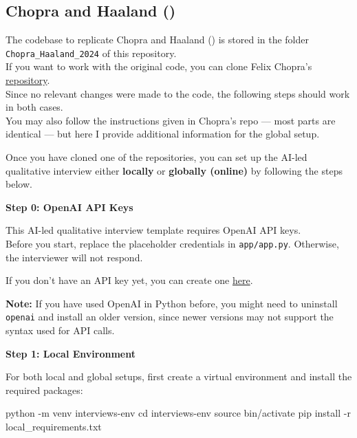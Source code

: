 \documentclass[
  letterpaper,
  DIV=11,
  numbers=noendperiod]{scrartcl}
\newenvironment{Shaded}{\begin{snugshade}}{\end{snugshade}}
\newcommand{\AttributeTok}[1]{\textcolor[rgb]{0.40,0.45,0.13}{#1}}
\newcommand{\BuiltInTok}[1]{\textcolor[rgb]{0.00,0.23,0.31}{#1}}
\newcommand{\ExtensionTok}[1]{\textcolor[rgb]{0.00,0.23,0.31}{#1}}
\newcommand{\NormalTok}[1]{\textcolor[rgb]{0.00,0.23,0.31}{#1}}
\begin{document}
\subsection{\texorpdfstring{Chopra and Haaland
()}{Chopra and Haaland (2024)}}\label{sec-replication-chopra}

The codebase to replicate Chopra and Haaland
() is stored in the folder
\texttt{Chopra\_Haaland\_2024} of this repository.\\
If you want to work with the original code, you can clone Felix Chopra's
\href{https://github.com/fchop/interviews}{repository}.\\
Since no relevant changes were made to the code, the following steps
should work in both cases.\\
You may also follow the instructions given in Chopra's repo --- most
parts are identical --- but here I provide additional information for
the global setup.

Once you have cloned one of the repositories, you can set up the AI-led
qualitative interview either \textbf{locally} or \textbf{globally
(online)} by following the steps below.

\textbf{Step 0: OpenAI API Keys}

This AI-led qualitative interview template requires OpenAI API keys.\\
Before you start, replace the placeholder credentials in
\texttt{app/app.py}. Otherwise, the interviewer will not respond.

If you don't have an API key yet, you can create one
\href{https://platform.openai.com/settings/organization/api-keys}{here}.

\textbf{Note:} If you have used OpenAI in Python before, you might need
to uninstall \texttt{openai} and install an older version, since newer
versions may not support the syntax used for API calls.

\textbf{Step 1: Local Environment}

For both local and global setups, first create a virtual environment and
install the required packages:

\begin{Shaded}
\begin{Highlighting}[]
\ExtensionTok{python} \AttributeTok{{-}m}\NormalTok{ venv interviews{-}env}
\BuiltInTok{cd}\NormalTok{ interviews{-}env}
\BuiltInTok{source}\NormalTok{ bin/activate}
\ExtensionTok{pip}\NormalTok{ install }\AttributeTok{{-}r}\NormalTok{ local\_requirements.txt}
\end{Highlighting}
\end{Shaded}
\end{document}
